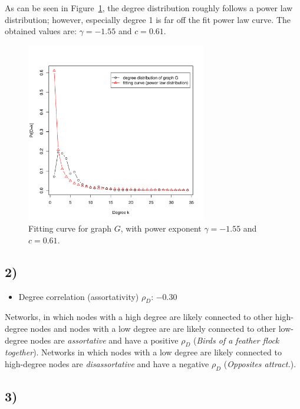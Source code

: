 \documentclass{article}
\begin{document}
As can be seen in Figure~\ref{fig:fitted-curve}, the degree
distribution roughly follows a power law distribution; however,
especially degree 1 is far off the fit power law curve. The obtained
values are: $\gamma = - 1.55$ and $c = 0.61$.

\begin{figure}[H]
  \centering
  \includegraphics[width=0.7\textwidth]{fitted_curve_normalized}
  \caption{Fitting curve for graph $G$, with power exponent $\gamma =
    - 1.55$ and $c = 0.61$.}
  \label{fig:fitted-curve}
\end{figure}

\subsection*{2)}

\begin{itemize}
\item Degree correlation (assortativity) $\rho_D$: $-0.30$
\end{itemize}
Networks, in which nodes with a high degree are likely connected to
other high-degree nodes and nodes with a low degree are are likely
connected to other low-degree nodes are \emph{assortative} and have a
positive $\rho_D$ (\emph{Birds of a feather flock together}). Networks
in which nodes with a low degree are likely connected to high-degree
nodes are \emph{disassortative} and have a negative $\rho_D$
(\emph{Opposites attract.}).

\subsection*{3)}
\end{document}

